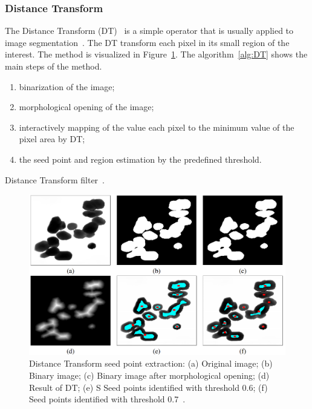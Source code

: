 \documentclass{lutmscthesis}[2010/09/22]
\begin{document}
\subsubsection{Distance Transform}

The Distance Transform (DT)~\cite{DT} is a simple operator that is usually applied to image segmentation~\cite{zafari-thesis}. The DT transform each pixel in its small region of the interest.
The method is visualized in Figure~\ref{fig:DT_img}. The algorithm~\ref{alg:DT} shows the main steps of the method.

\begin{algorithm} [H]
   \begin{enumerate}
        \item binarization of the image;
        \item morphological opening of the image;
        \item interactively mapping of the value each pixel to the minimum value of the pixel area by DT;
        \item the seed point and region estimation by the predefined threshold.
    \end{enumerate}
    \caption{Distance Transform filter~\cite{DT-bactery}.}\label{alg:DT}
\end{algorithm}

\begin{figure} [ht]
  \includegraphics[width=\linewidth]{DT.png}
  \caption{
    Distance Transform seed point extraction: (a) Original image; (b) Binary image;
    (c) Binary image after morphological opening; 
    (d) Result of DT; 
    (e) S Seed points identified with threshold 0.6; 
    (f)  Seed points identified with threshold 0.7~\cite{zafari-thesis}.}
  \label{fig:DT_img}
\end{figure}
\end{document}
